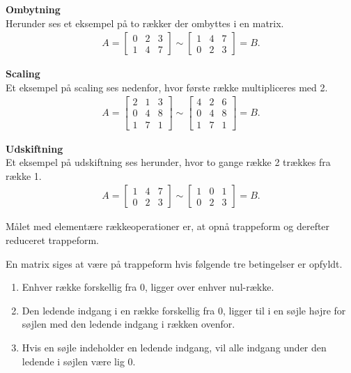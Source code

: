 \begin{eks}[Rækkeoperationer]
\textbf{Ombytning}\\
Herunder ses et eksempel på to rækker der ombyttes i en matrix.\\

\begin{align*}
A= \begin{bmatrix}
0 & 2 & 3 \\
1 & 4 & 7
\end{bmatrix}
\sim \begin{bmatrix}
1 & 4 & 7 \\
0 & 2 & 3
\end{bmatrix} = B.
\end{align*}

\textbf{Scaling} \\
Et eksempel på scaling ses nedenfor, hvor første række multipliceres med 2.\\

\begin{align*}
A= \begin{bmatrix}
2 & 1 & 3 \\
0 & 4 & 8 \\
1 & 7 & 1
\end{bmatrix}
\sim \begin{bmatrix}
4 & 2 & 6 \\
0 & 4 & 8 \\
1 & 7 & 1
\end{bmatrix} = B.
\end{align*}

\textbf{Udskiftning}\\
Et eksempel på udskiftning ses herunder, hvor to gange række 2 trækkes fra række 1.\\

\begin{align*}
A= \begin{bmatrix}
1 & 4 & 7 \\
0 & 2 & 3
\end{bmatrix}
\sim \begin{bmatrix}
1 & 0 & 1 \\
0 & 2 & 3
\end{bmatrix} = B.
\end{align*}
\end{eks}

Målet med elementære rækkeoperationer er, at opnå trappeform og derefter reduceret trappeform. 

\begin{defn}[Trappeform]
En matrix siges at være på trappeform hvis følgende tre betingelser er opfyldt. 
\begin{enumerate}
\item Enhver række forskellig fra 0, ligger over enhver nul-række.
\item Den ledende indgang i en række forskellig fra 0, ligger til i en søjle højre for søjlen med den ledende indgang i rækken ovenfor.
\item Hvis en søjle indeholder en ledende indgang, vil alle indgang under den ledende i søjlen være lig 0.
\end{enumerate}
\label{defn_trappe}
\end{defn}

